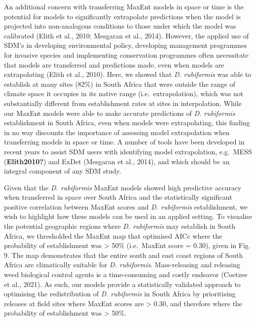 \documentclass[12pt,]{article}
\begin{document}
An additional concern with transferring MaxEnt models in space or time
is the potential for models to significantly extrapolate predictions
when the model is projected into non-analogous conditions to those under
which the model was calibrated (Elith et al., 2010; Mesgaran et al.,
2014). However, the applied use of SDM's in developing environmental
policy, developing management programmes for invasive species and
implementing conservation programmes often necessitate that models are
transferred and predictions made, even when models are extrapolating
(Elith et al., 2010). Here, we showed that \emph{D. rubiformis} was able
to establish at many sites (82\%) in South Africa that were outside the
range of climate space it occupies in its native range
(i.e.~extrapolation), which was not substantially different from
establishment rates at sites in interpolation. While our MaxEnt models
were able to make accurate predictions of \emph{D. rubiformis}
establishment in South Africa, even when models were extrapolating, this
finding in no way discounts the importance of assessing model
extrapolation when transferring models in space or time. A number of
tools have been developed in recent years to assist SDM users with
identifying model extrapolation, e.g.~MESS (\textbf{Elith2010?}) and
ExDet (Mesgaran et al., 2014), and which should be an integral component
of any SDM study.

Given that the \emph{D. rubiformis} MaxEnt models showed high predictive
accuracy when transferred in space over South Africa and the
statistically significant positive correlation between MaxEnt scores and
\emph{D. rubiformis} establishment, we wish to highlight how these
models can be used in an applied setting. To visualise the potential
geographic regions where \emph{D. rubiformis} may establish in South
Africa, we thresholded the MaxEnt map that optimised AICc where the
probability of establishment was \textgreater{} 50\% (i.e.~MaxEnt score
= 0.30), given in Fig. 9. The map demonstrates that the entire south and
east coast regions of South Africa are climatically suitable for
\emph{D. rubiformis}. Mass-releasing and releasing weed biological
control agents is a time-consuming and costly endeavor (Coetzee et al.,
2021). As such, our models provide a statistically validated approach to
optimising the redistribution of \emph{D. rubiformis} in South Africa by
prioritising releases at field sites where MaxEnt scores are
\textgreater{} 0.30, and therefore where the probability of
establishment was \textgreater{} 50\%.
\end{document}
